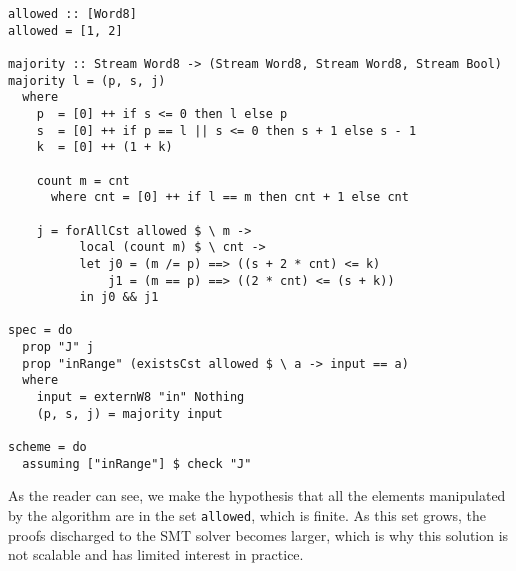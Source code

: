 \begin{lstlisting}[frame=single]
allowed :: [Word8]
allowed = [1, 2]

majority :: Stream Word8 -> (Stream Word8, Stream Word8, Stream Bool)
majority l = (p, s, j)
  where
    p  = [0] ++ if s <= 0 then l else p
    s  = [0] ++ if p == l || s <= 0 then s + 1 else s - 1
    k  = [0] ++ (1 + k)
    
    count m = cnt
      where cnt = [0] ++ if l == m then cnt + 1 else cnt
    
    j = forAllCst allowed $ \ m ->
          local (count m) $ \ cnt ->
          let j0 = (m /= p) ==> ((s + 2 * cnt) <= k)
              j1 = (m == p) ==> ((2 * cnt) <= (s + k))
          in j0 && j1

spec = do
  prop "J" j
  prop "inRange" (existsCst allowed $ \ a -> input == a)
  where
    input = externW8 "in" Nothing
    (p, s, j) = majority input

scheme = do
  assuming ["inRange"] $ check "J"
\end{lstlisting}

As the reader can see, we make the hypothesis that all the elements
manipulated by the algorithm are in the set \texttt{allowed}, which is
finite. As this set grows, the proofs discharged to the SMT solver
becomes larger, which is why this solution
is not scalable and has limited interest in practice.
